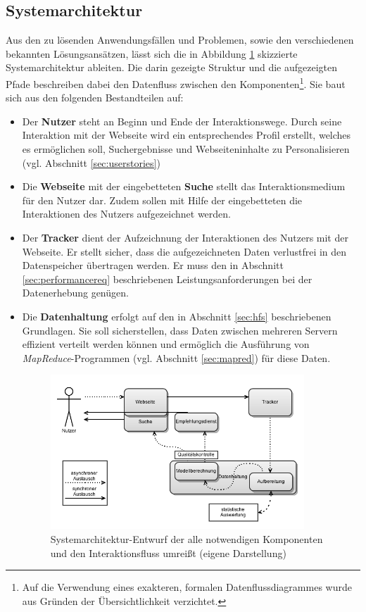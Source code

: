 \subsection{Systemarchitektur}\label{sec:system_rough}

Aus den zu lösenden Anwendungsfällen und Problemen, sowie den verschiedenen bekannten Lösungsansätzen, lässt sich die in Abbildung \ref{fig:system_rough} skizzierte Systemarchitektur ableiten. Die darin gezeigte Struktur und die aufgezeigten Pfade beschreiben dabei den Datenfluss zwischen den Komponenten\footnote{Auf die Verwendung eines exakteren, formalen Datenflussdiagrammes wurde aus Gründen der Übersichtlichkeit verzichtet.}. Sie baut sich aus den folgenden Bestandteilen auf:

\begin{itemize}
\item Der \textbf{Nutzer} steht an Beginn und Ende der Interaktionswege. Durch seine Interaktion mit der Webseite wird ein entsprechendes Profil erstellt, welches es ermöglichen soll, Suchergebnisse und Webseiteninhalte  zu Personalisieren (vgl. Abschnitt \ref{sec:userstories})
\item Die \textbf{Webseite} mit der eingebetteten \textbf{Suche} stellt das Interaktionsmedium für den Nutzer dar. Zudem sollen mit Hilfe der eingebetteten  die Interaktionen des Nutzers aufgezeichnet werden.
\item Der \textbf{Tracker} dient der Aufzeichnung der Interaktionen des Nutzers mit der Webseite. Er stellt sicher, dass die aufgezeichneten Daten verlustfrei in den Datenspeicher übertragen werden. Er muss den in Abschnitt \ref{sec:performancereq} beschriebenen Leistungsanforderungen bei der Datenerhebung genügen.
\item Die \textbf{Datenhaltung} erfolgt auf den in Abschnitt \ref{sec:hfs} beschriebenen Grundlagen. Sie soll sicherstellen, dass Daten zwischen mehreren  Servern effizient verteilt werden können und ermöglich die Ausführung von \textit{MapReduce}-Programmen (vgl. Abschnitt \ref{sec:mapred}) für diese Daten.

\begin{figure}[H]
  \centering
    \includegraphics[width=0.9\textwidth]{Abbildungen/Systemmodell.png}
    \caption[Systenarchitektur]{\footnotesize Systemarchitektur-Entwurf der alle notwendigen Komponenten und den Interaktionsfluss umreißt (eigene Darstellung)}
    \label{fig:system_rough}
\end{figure}


\end{itemize}
